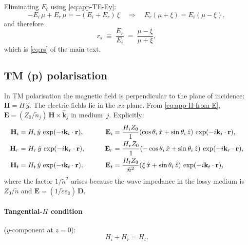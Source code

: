 \documentclass[11pt,a4paper]{article}
\theoremstyle{definition}      %
\newcommand{\khat}{\hat{\bm{k}}}
\newcommand{\rr}{\mathbf{r}}
\newcommand{\EE}{\mathbf{E}}
\newcommand{\HH}{\mathbf{H}}
\newcommand{\ntilde}{\tilde{n}}
\begin{document}
Eliminating $E_t$ using \cref{eq:app-TE-Ey}:
\begin{equation}
  -E_i\,\mu + E_r\,\mu = -(E_i+E_r)\,\xi
  \quad\Longrightarrow\quad
  E_r(\mu+\xi) = E_i(\mu-\xi),
\end{equation}
and therefore
\begin{equation}\label{eq:app-rs-result}
  \boxed{r_s \;\equiv\; \frac{E_r}{E_i}
    \;=\; \frac{\mu - \xi}{\mu + \xi},}
\end{equation}
which is \cref{eq:rs} of the main text.

\subsection{TM (p) polarisation}
\label{app:fresnel-TM}

In TM polarisation the magnetic field is perpendicular to the plane
of incidence: $\HH=H\,\hat{y}$.  The electric fields lie in the
$xz$-plane.  From \cref{eq:app-H-from-E}, $\EE=(Z_0/\ntilde_j)\,
\HH\times\khat_j$ in medium~$j$.  Explicitly:
\begin{alignat}{2}
  \HH_i &= H_i\,\hat{y}\,\exp(-i\mathbf{k}_i\cdot\rr),
  &\qquad
  \EE_i &= \frac{H_i Z_0}{1}(\cos\theta_i\,\hat{x} + \sin\theta_i\,\hat{z})\,\exp(-i\mathbf{k}_i\cdot\rr),
  \notag\\
  \HH_r &= H_r\,\hat{y}\,\exp(-i\mathbf{k}_r\cdot\rr),
  &\qquad
  \EE_r &= \frac{H_r Z_0}{1}(-\cos\theta_i\,\hat{x} + \sin\theta_i\,\hat{z})\,\exp(-i\mathbf{k}_r\cdot\rr),
  \notag\\
  \HH_t &= H_t\,\hat{y}\,\exp(-i\mathbf{k}_t\cdot\rr),
  &\qquad
  \EE_t &= \frac{H_t Z_0}{\ntilde^2}(\xi\,\hat{x} + \sin\theta_i\,\hat{z})\,\exp(-i\mathbf{k}_t\cdot\rr),
\end{alignat}
where the factor $1/\ntilde^2$ arises because the wave impedance in
the lossy medium is $Z_0/\ntilde$ and
$\EE=(1/\tilde{\varepsilon}\varepsilon_0)\,\mathbf{D}$.

\paragraph{Tangential-$H$ condition} ($y$-component at $z=0$):
\begin{equation}\label{eq:app-TM-Hy}
  H_i + H_r = H_t.
\end{equation}
\end{document}
